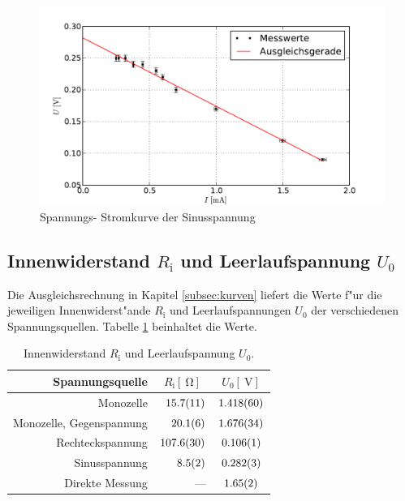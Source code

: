 		\begin{figure}[h]
			\centering
			\includegraphics[width = 15cm]{img/graph_sinus.pdf}
			\caption{Spannungs- Stromkurve der Sinusspannung \label{fig:graph_sinus}}
		\end{figure}

	\clearpage

	\subsection{Innenwiderstand $R_\mathrm{i}$ und Leerlaufspannung $U_0$}
	\label{subsec:ri-u0}
		Die Ausgleichsrechnung in Kapitel \ref{subsec:kurven} liefert die Werte f"ur die jeweiligen Innenwiderst"ande $R_\mathrm{i}$ und Leerlaufspannungen $U_0$ der verschiedenen Spannungsquellen.
		Tabelle \ref{table:ri-u0} beinhaltet die Werte.

		\begin{table}[h!]
			\begin{center}
				\caption{Innenwiderstand $R_\mathrm{i}$ und Leerlaufspannung $U_0$. \label{table:ri-u0}}
				\begin{tabular}{|r|r|c|}
					\hline
						Spannungsquelle & \multicolumn{1}{|c|}{$R_\mathrm{i} [\SI{}{\ohm}]$} & $U_0 [\SI{}{\volt}]$ \\ 
					\hline 
					\hline
						Monozelle & $\SI{15.7 (11)}{}$ & $\SI{1.418 (60)}{}$ \\
						Monozelle, Gegenspannung & $\SI{20.1 (6)}{}$ & $\SI{1.676 (34)}{}$ \\
						Rechteckspannung & $\SI{107.6 (30)}{}$ & $\SI{.106 (1)}{}$ \\
						Sinusspannung & $\SI{8.5 (2)}{}$ & $\SI{.282 (3)}{}$ \\ 
						Direkte Messung & --- & $\SI{1.65 (2)}{}$ \\
					\hline 
				\end{tabular}
			\end{center}
		\end{table}

